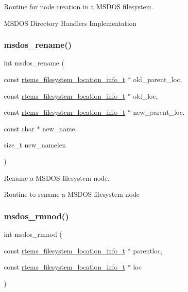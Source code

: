 Routine for node creation in a M\+S\+D\+OS filesystem. 

M\+S\+D\+OS Directory Handlers Implementation \mbox{\label{group__libfs__msdos_ga8f13c780cd05667aef2b563ee03154c1}} 
\subsubsection{\texorpdfstring{msdos\_rename()}{msdos\_rename()}}
{\footnotesize\ttfamily int msdos\+\_\+rename (\begin{DoxyParamCaption}\item[{const \mbox{\hyperlink{group__LibIO_ga3252b3d31ee3c49ffff0b7604a676864}{rtems\+\_\+filesystem\+\_\+location\+\_\+info\+\_\+t}} $\ast$}]{old\+\_\+parent\+\_\+loc,  }\item[{const \mbox{\hyperlink{group__LibIO_ga3252b3d31ee3c49ffff0b7604a676864}{rtems\+\_\+filesystem\+\_\+location\+\_\+info\+\_\+t}} $\ast$}]{old\+\_\+loc,  }\item[{const \mbox{\hyperlink{group__LibIO_ga3252b3d31ee3c49ffff0b7604a676864}{rtems\+\_\+filesystem\+\_\+location\+\_\+info\+\_\+t}} $\ast$}]{new\+\_\+parent\+\_\+loc,  }\item[{const char $\ast$}]{new\+\_\+name,  }\item[{size\+\_\+t}]{new\+\_\+namelen }\end{DoxyParamCaption})}



Rename a M\+S\+D\+OS filesystem node. 

Routine to rename a M\+S\+D\+OS filesystem node \mbox{\label{group__libfs__msdos_gadc2a558d9dd4a7b65b22cd0ec527c236}} 
\subsubsection{\texorpdfstring{msdos\_rmnod()}{msdos\_rmnod()}}
{\footnotesize\ttfamily int msdos\+\_\+rmnod (\begin{DoxyParamCaption}\item[{const \mbox{\hyperlink{group__LibIO_ga3252b3d31ee3c49ffff0b7604a676864}{rtems\+\_\+filesystem\+\_\+location\+\_\+info\+\_\+t}} $\ast$}]{parentloc,  }\item[{const \mbox{\hyperlink{group__LibIO_ga3252b3d31ee3c49ffff0b7604a676864}{rtems\+\_\+filesystem\+\_\+location\+\_\+info\+\_\+t}} $\ast$}]{loc }\end{DoxyParamCaption})}



